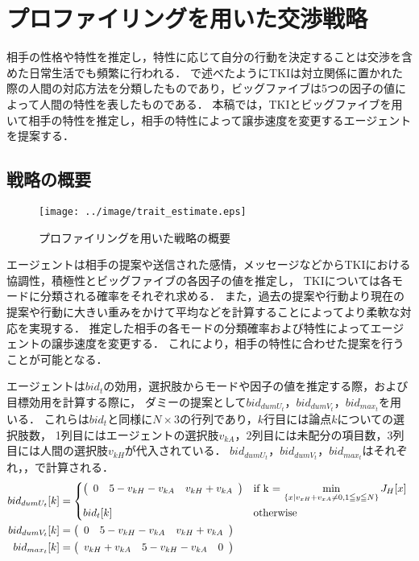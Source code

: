 

\chapter{プロファイリングを用いた交渉戦略}
相手の性格や特性を推定し，特性に応じて自分の行動を決定することは交渉を含めた日常生活でも頻繁に行われる．
で述べたようにTKIは対立関係に置かれた際の人間の対応方法を分類したものであり，ビッグファイブは5つの因子の値によって人間の特性を表したものである．
本稿では，TKIとビッグファイブを用いて相手の特性を推定し，相手の特性によって譲歩速度を変更するエージェントを提案する．

\section{戦略の概要}
\begin{figure}[tb]
    \centering
    \texttt{[image: ../image/trait\_estimate.eps]}
    \caption{プロファイリングを用いた戦略の概要}
    \label{fig:trait_estimate}
\end{figure}
エージェントは相手の提案や送信された感情，メッセージなどからTKIにおける協調性，積極性とビッグファイブの各因子の値を推定し，
TKIについては各モードに分類される確率をそれぞれ求める．
また，過去の提案や行動より現在の提案や行動に大きい重みをかけて平均などを計算することによってより柔軟な対応を実現する．
推定した相手の各モードの分類確率および特性によってエージェントの譲歩速度を変更する．
これにより，相手の特性に合わせた提案を行うことが可能となる．

エージェントは$bid_t$の効用，選択肢からモードや因子の値を推定する際，および目標効用を計算する際に，
ダミーの提案として$bid_{dumU_t}$，$bid_{dumV_t}$，$bid_{max_t}$を用いる．
これらは$bid_t$と同様に$N \times 3$の行列であり，$k$行目には論点$k$についての選択肢数，
1列目にはエージェントの選択肢$v_{kA}$，2列目には未配分の項目数，3列目には人間の選択肢$v_{kH}$が代入されている．
$bid_{dumU_t}$，$bid_{dumV_t}$，$bid_{max_t}$はそれぞれ，，で計算される．
\begin{align}
    bid_{dumU_t}[k] &= 
    \begin{cases*}
        \left(
    \begin{array}{rrr}
        0 & 5 - v_{kH} - v_{kA} & v_{kH} + v_{kA}
    \end{array}
    \right) & if k = $\displaystyle \min_{\{x | v_{xH} + v_{xA} \neq 0, 1 \leqq y \leqq N \} } J_H[x]$ \\
        bid_t[k] & otherwise
    \end{cases*}
    \label{eq:dummyutil} \\
    bid_{dumV_t}[k] &= 
        \left(
    \begin{array}{rrr}
        0 & 5 - v_{kH} - v_{kA} & v_{kH} + v_{kA}
    \end{array}
    \right)
    \label{eq:dummyvalue} \\
    bid_{max_t}[k] &= 
        \left(
    \begin{array}{rrr}
        v_{kH} + v_{kA} & 5 - v_{kH} - v_{kA} & 0
    \end{array}
    \right)
    \label{eq:maxutil} 
\end{align}

